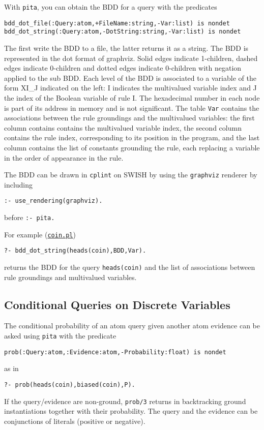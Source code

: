 With \verb|pita|, you can obtain the BDD for a query with the predicates
\begin{verbatim}
bdd_dot_file(:Query:atom,+FileName:string,-Var:list) is nondet
bdd_dot_string(:Query:atom,-DotString:string,-Var:list) is nondet
\end{verbatim}
The first write the BDD to a file, the latter returns it as a string.
The BDD is represented in the dot format of graphviz.
Solid edges indicate 1-children, dashed edges indicate 0-children and dotted
edges indicate 0-children with negation applied to the sub BDD.
Each level of the BDD is associated to a variable of the form XI\_J indicated on the left:
I indicates the multivalued variable index and J the index of the Boolean variable of rule I.
The hexadecimal number in each node is part of its address in memory and is not significant.
The table \verb|Var| contains the associations between the rule groundings and the
multivalued variables: the first column contains contains the multivalued variable index,
the second column contains the rule index, corresponding
to its position in the program, and the last column contains the list
of constants grounding the rule, each replacing a variable in the order of appearance in the
rule.

The BDD can be drawn in \verb|cplint| on SWISH by using the \verb|graphviz| renderer
by including
\begin{verbatim}
:- use_rendering(graphviz).
\end{verbatim}
before \verb|:- pita.|

For example (\href{http://cplint.eu/example/inference/coin.pl}{\texttt{coin.pl}})
\begin{verbatim}
?- bdd_dot_string(heads(coin),BDD,Var).
\end{verbatim}
returns the BDD for the query \verb|heads(coin)| and the list of associations between rule groundings and
multivalued variables.


\subsection{Conditional Queries on Discrete Variables}
\label{condq}
The conditional probability of an atom query given another atom evidence can be asked using \verb|pita| with the predicate
\begin{verbatim}
prob(:Query:atom,:Evidence:atom,-Probability:float) is nondet
\end{verbatim}
as in
\begin{verbatim}
?- prob(heads(coin),biased(coin),P).
\end{verbatim}
If the query/evidence are non-ground, \verb|prob/3| returns in backtracking ground instantiations together with their probability. The query and the evidence can be conjunctions of literals (positive or negative).


